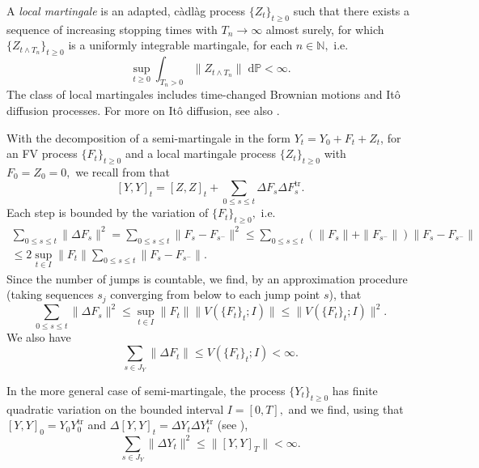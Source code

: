 \documentclass[reqno,12pt]{amsart}
\theoremstyle{plain} %
\theoremstyle{definition} %
\newcommand{\tr}{{\operatorname{tr}}}
\begin{document}
A \emph{local martingale} is an adapted, c\`adl\`ag process $\{Z_t\}_{t\geq 0}$ such that there exists a sequence of increasing stopping times with $T_n \rightarrow \infty$ almost surely, for which $\{Z_{t \wedge T_n}\}_{t \geq 0}$ is a uniformly integrable martingale, for each $n\in\mathbb{N},$ i.e.
\[
    \sup_{t \geq 0} \int_{T_n > 0}\|Z_{t\wedge T_n}\|\;\mathrm{d}\mathbb{P} < \infty.
\]
The class of local martingales includes time-changed Brownian motions and It\^o diffusion processes. For more on It\^o diffusion, see also \cite{Oksendal2003}.

With the decomposition of a semi-martingale in the form $Y_t = Y_0 + F_t + Z_t$, for an FV process $\{F_t\}_{t\geq 0}$ and a local martingale process $\{Z_t\}_{t\geq 0}$ with $F_0 = Z_0 = 0,$ we recall from \cite[Lemma 18.7]{Metivier1982} that
\[
    [Y, Y]_t = [Z, Z]_t + \sum_{0 \leq s \leq t} \Delta F_s \Delta F_s^\tr.
\]
Each step is bounded by the variation of $\{F_t\}_{t\geq 0},$ i.e.
\begin{multline*}
    \sum_{0 \leq s \leq t} \|\Delta F_s\|^2 = \sum_{0 \leq s \leq t} \|F_s - F_{s^-}\|^2 \leq \sum_{0 \leq s \leq t} (\|F_s\| + \|F_{s^-}\|)\|F_s - F_{s^-}\| \\
    \leq 2\sup_{t\in I} \|F_t\| \sum_{0 \leq s \leq t} \|F_s - F_{s^-}\|.
\end{multline*}
Since the number of jumps is countable, we find, by an approximation procedure (taking sequences $s_j$ converging from below to each jump point $s$), that
\[
    \sum_{0 \leq s \leq t} \|\Delta F_s\|^2 \leq \sup_{t\in I} \|F_t\| \|V(\{F_t\}_t; I)\| \leq \|V(\{F_t\}_t; I)\|^2.
\]
We also have
\begin{equation}
    \label{estimatejumpfv}
    \sum_{s\in J_{Y}} \|\Delta F_t\| \leq V(\{F_t\}_t; I) < \infty.
\end{equation}

In the more general case of semi-martingale, the process $\{Y_t\}_{t\geq 0}$ has finite quadratic variation \cite[Section II.6]{Protter2005} on the bounded interval $I=[0, T],$ and we find, using that $[Y, Y]_0 = Y_0 Y_0^\tr$ and $\Delta [Y, Y]_t = \Delta Y_t \Delta Y_t^\tr$ (see \cite[Theorem II.22]{Protter2005}),
\begin{equation}
    \label{estimatejumpsemimartingale}
    \sum_{s\in J_{Y}} \|\Delta Y_t\|^2 \leq \|[Y, Y]_T\| < \infty.
\end{equation}
\end{document}
